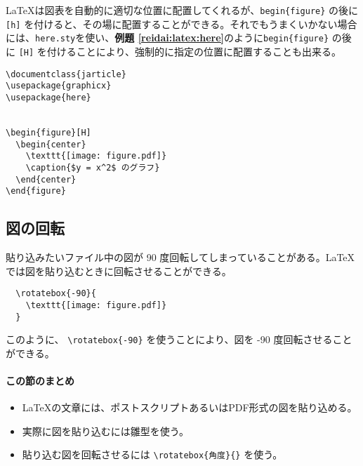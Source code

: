 \LaTeX は図表を自動的に適切な位置に配置してくれるが、\verb|begin{figure}| の後に \texttt{[h]} を付けると、その場に配置することができる。それでもうまくいかない場合には、\texttt{here.sty}を使い、\textbf{例題 \ref{reidai:latex:here}}のように\verb|begin{figure}| の後に \texttt{[H]} を付けることにより、強制的に指定の位置に配置することも出来る。
\begin{reidai}
\label{reidai:latex:here}
\begin{verbatim}
\documentclass{jarticle}
\usepackage{graphicx}
\usepackage{here}


\begin{figure}[H]
  \begin{center}
    \texttt{[image: figure.pdf]}
    \caption{$y = x^2$ のグラフ}
  \end{center}
\end{figure}

\end{verbatim}
\end{reidai}

\subsection{図の回転}
\label{sec:latex:rotate_pdf}

貼り込みたいファイル中の図が 90 度回転してしまっていることがある。\LaTeX では図を貼り込むときに回転させることができる。
\begin{reidai}
\begin{verbatim}
  \rotatebox{-90}{
    \texttt{[image: figure.pdf]}
  }
\end{verbatim}
\end{reidai} \noindent
\vspace*{-1.5em}
\begin{kekka}
  \begin{center}
  \end{center}
\end{kekka} \noindent
このように、 \verb|\rotatebox{-90}| を使うことにより、図を -90 度回転させることができる。


\paragraph{この節のまとめ}

\begin{itemize}
\item \LaTeX の文章には、ポストスクリプトあるいはPDF形式の図を貼り込める。
\item 実際に図を貼り込むには雛型を使う。
\item 貼り込む図を回転させるには \verb|\rotatebox{角度}{}| を使う。
\end{itemize}

